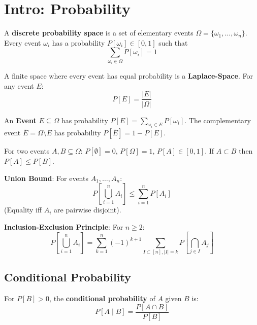 \section{Intro: Probability}

\begin{definition}
A \textbf{discrete probability space} is a set of elementary events $\Omega = \{\omega_1, \dots, \omega_n \}$.
Every event $\omega_i$ has a probability $P[\omega_i] \in [0,1]$ such that
$$\sum_{\omega_i \in \Omega} P[\omega_i] = 1$$
\end{definition}

\begin{remark}
A finite space where every event has equal probability is a \textbf{Laplace-Space}. For any event $E$:
$$P[E] = \frac{\vert E \vert}{\vert \Omega \vert}$$
\end{remark}

\begin{definition}
An \textbf{Event} $E \subseteq \Omega$ has probability $P[E] = \sum_{\omega_i \in E} P[\omega_i]$.
The complementary event $\bar{E} = \Omega \setminus E$ has probability $P[\bar{E}] = 1 - P[E]$.
\end{definition}

\begin{theorem}
For two events $A, B \subseteq \Omega$:
$P[\emptyset] = 0$, $P[\Omega] = 1$, $P[A] \in [0,1]$.
If $A \subset B$ then $P[A] \le P[B]$.
\end{theorem}

\begin{theorem}
\textbf{Union Bound}: For events $A_1, \dots, A_n$:
$$P[\bigcup_{i=1}^n A_i] \leq \sum_{i=1}^n P[A_i]$$
(Equality iff $A_i$ are pairwise disjoint).
\end{theorem}

\begin{theorem}
\textbf{Inclusion-Exclusion Principle}: For $n \geq 2$:
$$P[\bigcup_{i=1}^n A_i] = \sum_{k=1}^n (-1)^{k+1} \sum_{I \subset [n], |I|=k} P[\bigcap_{j \in I} A_j]$$
\end{theorem}

\subsection{Conditional Probability}

\begin{definition}
For $P[B] > 0$, the \textbf{conditional probability} of $A$ given $B$ is:
$$P[A \mid B] = \frac{P[A \cap B]}{P[B]}$$
\end{definition}

